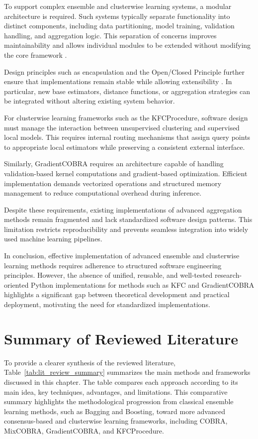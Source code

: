 To support complex ensemble and clusterwise learning systems, a modular architecture is required. Such systems typically separate functionality into distinct components, including data partitioning, model training, validation handling, and aggregation logic. This separation of concerns improves maintainability and allows individual modules to be extended without modifying the core framework \cite{gamma1993,meyer1988}.

Design principles such as encapsulation and the Open/Closed Principle further ensure that implementations remain stable while allowing extensibility \cite{meyer1988}. In particular, new base estimators, distance functions, or aggregation strategies can be integrated without altering existing system behavior.

For clusterwise learning frameworks such as the KFCProcedure, software design must manage the interaction between unsupervised clustering and supervised local models. This requires internal routing mechanisms that assign query points to appropriate local estimators while preserving a consistent external interface.

Similarly, GradientCOBRA requires an architecture capable of handling validation-based kernel computations and gradient-based optimization. Efficient implementation demands vectorized operations and structured memory management to reduce computational overhead during inference.

Despite these requirements, existing implementations of advanced aggregation methods remain fragmented and lack standardized software design patterns. This limitation restricts reproducibility and prevents seamless integration into widely used machine learning pipelines.

In conclusion, effective implementation of advanced ensemble and clusterwise learning methods requires adherence to structured software engineering principles. However, the absence of unified, reusable, and well-tested research-oriented Python implementations for methods such as KFC and GradientCOBRA highlights a significant gap between theoretical development and practical deployment, motivating the need for standardized implementations.

\section{Summary of Reviewed Literature}

\hs To provide a clearer synthesis of the reviewed literature, Table~\ref{tab:lit_review_summary} summarizes the main methods and frameworks discussed in this chapter. The table compares each approach according to its main idea, key techniques, advantages, and limitations. This comparative summary highlights the methodological progression from classical ensemble learning methods, such as Bagging and Boosting, toward more advanced consensus-based and clusterwise learning frameworks, including COBRA, MixCOBRA, GradientCOBRA, and KFCProcedure.
    
